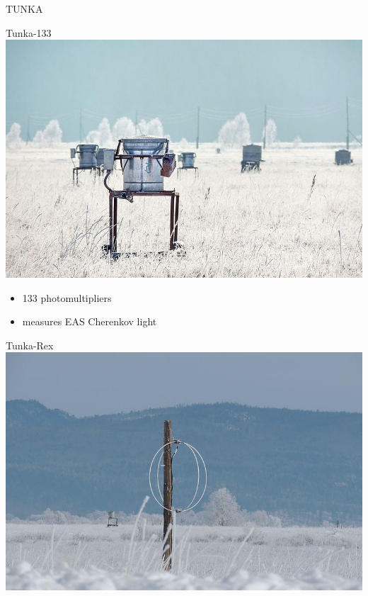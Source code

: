 \documentclass[18pt]{beamer}
\begin{document}
\begin{frame}{TUNKA}
\footnotesize
\vspace{-2em}
\begin{minipage}[t]{0.48\textwidth}
  \begin{block}{Tunka-133}
    \centering
    \includegraphics[height=0.23\textheight]{pics/Tunka-133.jpg}\vspace{-2ex}

    \begin{itemize}
      \setlength{\itemsep}{0pt}
      \item 133 photomultipliers
      \item measures EAS Cherenkov light
    \end{itemize}
  \end{block}
\end{minipage}
\hfill
\begin{minipage}[t]{0.48\textwidth}
  \begin{block}{Tunka-Rex}
    \centering
    \includegraphics[height=0.23\textheight]{pics/Tunka-Rex.jpg}\vspace{-2ex}


\end{block}
\end{minipage}
\end{frame}
\end{document}
